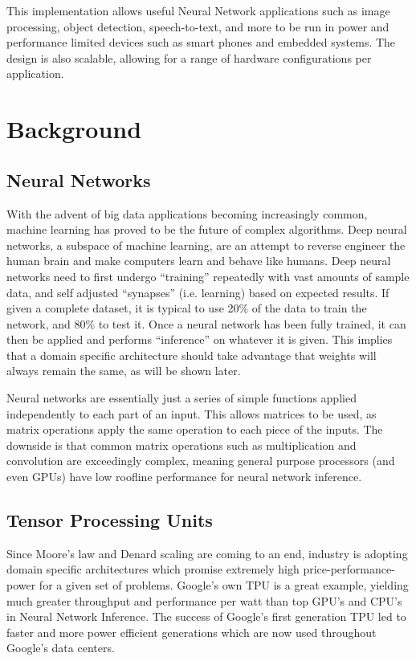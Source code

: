 \documentclass[11pt, conference, onecolumn]{IEEEtran}
\begin{document}
    This implementation allows useful Neural Network applications such as image processing,
    object detection, speech-to-text, and more to be run in power and performance limited
    devices such as smart phones and embedded systems. The design is also scalable,
    allowing for a range of hardware configurations per application.
\section{Background}

\subsection{Neural Networks}
    With the advent of big data applications becoming increasingly common, machine learning
    has proved to be the future of complex algorithms. Deep neural networks, a subspace of
    machine learning, are an attempt to reverse engineer the human brain and make computers
    learn and behave like humans. Deep neural networks need to first undergo “training”
    repeatedly with vast amounts of sample data, and self adjusted “synapses”
    (i.e. learning) based on expected results. If given a complete dataset, it is typical
    to use 20\% of the data to train the network, and 80\% to test it. Once a neural
    network has been fully trained, it can then be applied and performs  “inference” on
    whatever it is given. This implies that a domain specific architecture should take
    advantage that weights will always remain the same, as will be shown later.

    Neural networks are essentially just a series of simple functions applied independently
    to each part of an input. This allows matrices to be used, as matrix operations apply
    the same operation to each piece of the inputs. The downside is that common matrix
    operations such as multiplication and convolution are exceedingly complex, meaning
    general purpose processors (and even GPUs) have low roofline performance for
    neural network inference.

\subsection{Tensor Processing Units}
    Since Moore's law and Denard scaling are coming to an end, industry is adopting
    domain specific architectures which promise extremely high price-performance-power for
    a given set of problems. Google's own TPU is a great example, yielding much greater
    throughput and performance per watt than top GPU's and CPU's in Neural Network
    Inference. The success of Google's first generation TPU led to faster and more power
    efficient generations which are now used throughout Google's data centers.
\end{document}
